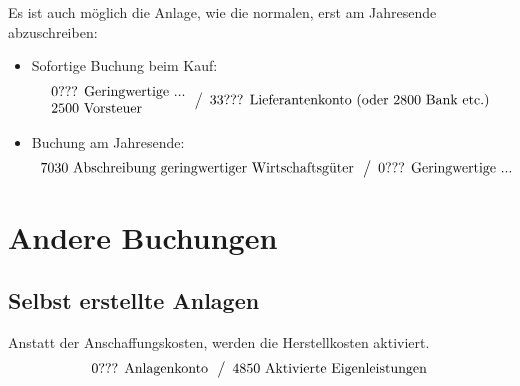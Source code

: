 \documentclass[a4paper,9pt]{article}
\begin{document}
Es ist auch möglich die Anlage, wie die normalen, erst am Jahresende
abzuschreiben:
\begin{itemize}
\item { Sofortige Buchung beim Kauf:\\
    \begin{equation*}
      \begin{array}{l}
        \text{0??? Geringwertige ...}\\
        \text{2500 Vorsteuer}\\
      \end{array}
      \left\slash
        \begin{array}{l}
          \text{33??? Lieferantenkonto (oder 2800 Bank etc.)}\\
        \end{array}
      \right.
    \end{equation*}
  }
\item { Buchung am Jahresende:\\
    \begin{equation*}
      \begin{array}{l}
        \text{7030 Abschreibung geringwertiger Wirtschaftsgüter}\\
      \end{array}
      \left\slash
        \begin{array}{l}
          \text{0??? Geringwertige ...}\\
        \end{array}
      \right.
    \end{equation*}
  }
\end{itemize}

\section{Andere Buchungen}
\subsection{Selbst erstellte Anlagen}
Anstatt der Anschaffungskosten, werden die Herstellkosten aktiviert.
\begin{equation*}
  \begin{array}{l}
    \text{0??? Anlagenkonto}\\
  \end{array}
  \left\slash
    \begin{array}{l}
      \text{4850 Aktivierte Eigenleistungen}\\
    \end{array}
  \right.
\end{equation*}
\end{document}
